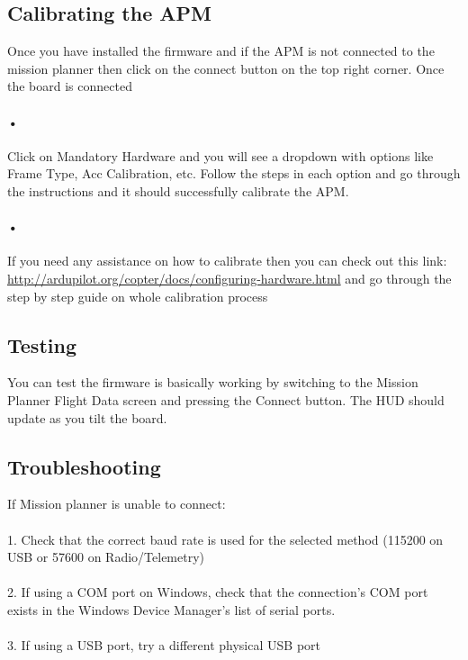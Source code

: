 \documentclass[11pt,a4paper]{article}
\begin{document}
		\subsection{Calibrating the APM}
			Once you have installed the firmware and if the APM is not connected to the mission planner then click on the connect button on the top right corner. Once the board is connected \paragraph{•} Click on Mandatory Hardware and you will see a dropdown with options like Frame Type, Acc Calibration, etc. Follow the steps in each option and go through the instructions and it should successfully calibrate the APM.
			\paragraph{•} If you need any assistance on how to calibrate then you can check out this link: \url{http://ardupilot.org/copter/docs/configuring-hardware.html} and go through the step by step guide on whole calibration process
		
		\subsection{Testing}
		You can test the firmware is basically working by switching to the Mission Planner Flight Data screen and pressing the Connect button. The HUD should update as you tilt the board.
		
		\subsection{Troubleshooting}
		If Mission planner is unable to connect:

\paragraph{}1. Check that the correct baud rate is used for the selected method (115200 on USB or 57600 on Radio/Telemetry)
\paragraph{}2. If using a COM port on Windows, check that the connection’s COM port exists in the Windows Device Manager’s list of serial ports.
\paragraph{}3. If using a USB port, try a different physical USB port
\end{document}
